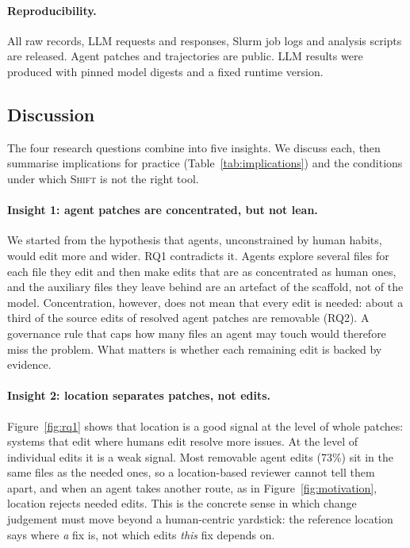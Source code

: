 \documentclass[a4paper,fleqn]{cas-sc}
\newcommand{\tool}{\textsc{Shift}}
\newcommand{\rqtwoUnneededInGoldShare}{73\%}
\begin{document}
\paragraph{Reproducibility.} All raw records, LLM requests and responses, Slurm job logs and analysis scripts are released. Agent patches and trajectories are public. LLM results were produced with pinned model digests and a fixed runtime version.


\subsection{Discussion}\label{sec:discussion}

The four research questions combine into five insights. We discuss each, then summarise implications for practice (Table~\ref{tab:implications}) and the conditions under which \tool{} is not the right tool.

\paragraph{Insight 1: agent patches are concentrated, but not lean.} We started from the hypothesis that agents, unconstrained by human habits, would edit more and wider. RQ1 contradicts it. Agents explore several files for each file they edit and then make edits that are as concentrated as human ones, and the auxiliary files they leave behind are an artefact of the scaffold, not of the model. Concentration, however, does not mean that every edit is needed: about a third of the source edits of resolved agent patches are removable (RQ2). A governance rule that caps how many files an agent may touch would therefore miss the problem. What matters is whether each remaining edit is backed by evidence.

\paragraph{Insight 2: location separates patches, not edits.} Figure~\ref{fig:rq1} shows that location is a good signal at the level of whole patches: systems that edit where humans edit resolve more issues. At the level of individual edits it is a weak signal. Most removable agent edits (\rqtwoUnneededInGoldShare{}) sit in the same files as the needed ones, so a location-based reviewer cannot tell them apart, and when an agent takes another route, as in Figure~\ref{fig:motivation}, location rejects needed edits. This is the concrete sense in which change judgement must move beyond a human-centric yardstick: the reference location says where \emph{a} fix is, not which edits \emph{this} fix depends on.
\end{document}
